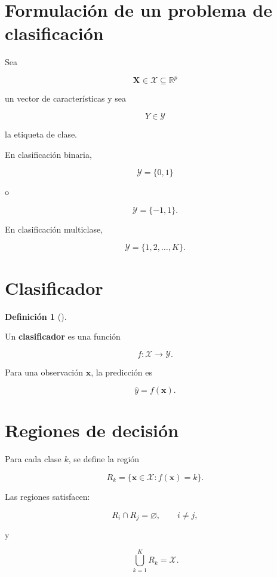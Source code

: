 \documentclass[
  spanish,
  11pt,
  letterpaper,
  DIV=11,
  numbers=noendperiod]{scrreprt}
\theoremstyle{definition}
\newtheorem{definition}{Definición}[chapter]
\theoremstyle{plain}
\theoremstyle{definition}
\theoremstyle{remark}
\begin{document}
\section{Formulación de un problema de
clasificación}\label{formulaciuxf3n-de-un-problema-de-clasificaciuxf3n}

Sea

\[
\mathbf{X}\in\mathcal{X}\subseteq\mathbb{R}^{p}
\]

un vector de características y sea

\[
Y\in\mathcal{Y}
\]

la etiqueta de clase.

En clasificación binaria,

\[
\mathcal{Y}=\{0,1\}
\]

o

\[
\mathcal{Y}=\{-1,1\}.
\]

En clasificación multiclase,

\[
\mathcal{Y}
=
\{1,2,\ldots,K\}.
\]

\section{Clasificador}\label{clasificador}

\begin{definition}[]\protect\hypertarget{def-clasificador}{}\label{def-clasificador}

Un \textbf{clasificador} es una función

\[
f:\mathcal{X}\to\mathcal{Y}.
\]

\end{definition}

Para una observación \(\mathbf{x}\), la predicción es

\[
\widehat{y}
=
f(\mathbf{x}).
\]

\section{Regiones de decisión}\label{regiones-de-decisiuxf3n}

Para cada clase \(k\), se define la región

\[
R_k
=
\{
\mathbf{x}\in\mathcal{X}
:
f(\mathbf{x})=k
\}.
\]

Las regiones satisfacen:

\[
R_i\cap R_j=\varnothing,
\qquad
i\neq j,
\]

y

\[
\bigcup_{k=1}^{K}R_k
=
\mathcal{X}.
\]
\end{document}
